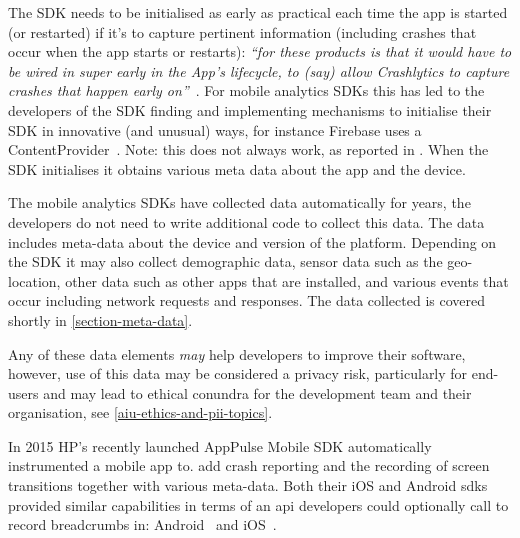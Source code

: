 The SDK needs to be initialised as early as practical each time the app is started (or restarted) if it's to capture pertinent information (including crashes that occur when the app starts or restarts): \emph{``for these products is that it would have to be wired in super early in the App's lifecycle, to (say) allow Crashlytics to capture crashes that happen early on''}~. 
For mobile analytics SDKs this has led to the developers of the SDK finding and implementing mechanisms to initialise their SDK in innovative (and unusual) ways, for instance Firebase uses a ContentProvider~. Note: this does not always work, as reported in . When the SDK initialises it obtains various meta data about the app and the device. 

The mobile analytics SDKs have collected data automatically for years, the developers do not need to write additional code to collect this data. The data includes meta-data about the device and version of the platform. Depending on the SDK it may also collect demographic data, sensor data such as the geo-location, other data such as other apps that are installed, and various events that occur including network requests and responses. The data collected is covered shortly in \ref{section-meta-data}.

Any of these data elements \emph{may} help developers to improve their software, however, use of this data may be considered a privacy risk, particularly for end-users and may lead to ethical conundra for the development team and their organisation, see \ref{aiu-ethics-and-pii-topics}.

In 2015 HP's recently launched AppPulse Mobile SDK automatically instrumented a mobile app to. add crash reporting and the recording of screen transitions together with various meta-data. Both their iOS and Android \Glspl{sdk} provided similar capabilities in terms of an \Gls{api} developers could optionally call to record breadcrumbs in: Android~ and iOS~.

